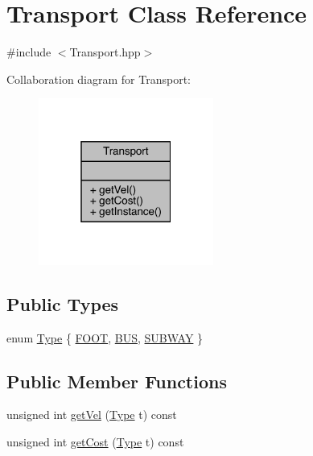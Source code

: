 \hypertarget{class_transport}{}\section{Transport Class Reference}
\label{class_transport}


{\ttfamily \#include $<$Transport.\+hpp$>$}



Collaboration diagram for Transport\+:
\nopagebreak
\begin{figure}[H]
\begin{center}
\leavevmode
\includegraphics[width=163pt]{class_transport__coll__graph}
\end{center}
\end{figure}
\subsection*{Public Types}
\begin{DoxyCompactItemize}
\item 
enum \hyperlink{class_transport_a1879cecfed0d4238e5a7af6d085db317}{Type} \{ \hyperlink{class_transport_a1879cecfed0d4238e5a7af6d085db317a9eb45a1db8620c55d48eeee34f09980c}{F\+O\+OT}, 
\hyperlink{class_transport_a1879cecfed0d4238e5a7af6d085db317a03910f9910b1cda89566027b1c4f2740}{B\+US}, 
\hyperlink{class_transport_a1879cecfed0d4238e5a7af6d085db317a1e7a9bb5192d54bdccb9bc99bd35849b}{S\+U\+B\+W\+AY}
 \}
\end{DoxyCompactItemize}
\subsection*{Public Member Functions}
\begin{DoxyCompactItemize}
\item 
unsigned int \hyperlink{class_transport_ae9b8f3d27331e429160827194e32bde1}{get\+Vel} (\hyperlink{class_transport_a1879cecfed0d4238e5a7af6d085db317}{Type} t) const
\item 
unsigned int \hyperlink{class_transport_a943eecabe9f2435fcbf2bd3a41a4ea3a}{get\+Cost} (\hyperlink{class_transport_a1879cecfed0d4238e5a7af6d085db317}{Type} t) const
\end{DoxyCompactItemize}

